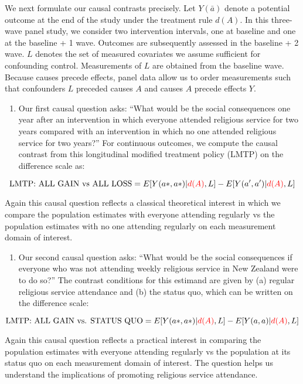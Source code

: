 \documentclass[
  single column]{article}
\providecommand{\tightlist}{%
  \setlength{\itemsep}{0pt}\setlength{\parskip}{0pt}}\usepackage{longtable,booktabs,array}
\begin{document}
We next formulate our causal contrasts precisely. Let \(Y(\bar{a})\)
denote a potential outcome at the end of the study under the treatment
rule \(d(A)\). In this three-wave panel study, we consider two
intervention intervals, one at baseline and one at the baseline + 1
wave. Outcomes are subsequently assessed in the baseline + 2 wave. \(L\)
denotes the set of measured covariates we assume sufficient for
confounding control. Measurements of \(L\) are obtained from the
baseline wave. Because causes precede effects, panel data allow us to
order measurements such that confounders \(L\) preceded causes \(A\) and
causes \(A\) precede effects \(Y\).

\begin{enumerate}
\def\labelenumi{\arabic{enumi}.}
\tightlist
\item
  Our first causal question asks: ``What would be the social
  consequences one year after an intervention in which everyone attended
  religious service for two years compared with an intervention in which
  no one attended religious service for two years?'' For continuous
  outcomes, we compute the causal contrast from this longitudinal
  modified treatment policy (LMTP) on the difference scale as:
\end{enumerate}

\[ \text{LMTP: ALL GAIN vs ALL LOSS} = E[Y(a*,a*)|\textcolor{red}{d(A)},L] - E[Y(a^\prime,a^\prime)|\textcolor{red}{d(A)},L] \]

Again this causal question reflects a classical theoretical interest in
which we compare the population estimates with everyone attending
regularly vs the population estimates with no one attending regularly on
each measurement domain of interest.

\begin{enumerate}
\def\labelenumi{\arabic{enumi}.}
\setcounter{enumi}{1}
\tightlist
\item
  Our second causal question asks: ``What would be the social
  consequences if everyone who was not attending weekly religious
  service in New Zealand were to do so?'' The contrast conditions for
  this estimand are given by (a) regular religious service attendance
  and (b) the status quo, which can be written on the difference scale:
\end{enumerate}

\[  \text{LMTP: ALL GAIN vs. STATUS QUO}  = E[Y(a*,a*)|\textcolor{red}{d(A)},L] - E[Y(a,a)|\textcolor{red}{d(A)},L] \]

Again this causal question reflects a practical interest in comparing
the population estimates with everyone attending regularly vs the
population at its status quo on each measurement domain of interest. The
question helps us understand the implications of promoting religious
service attendance.
\end{document}
